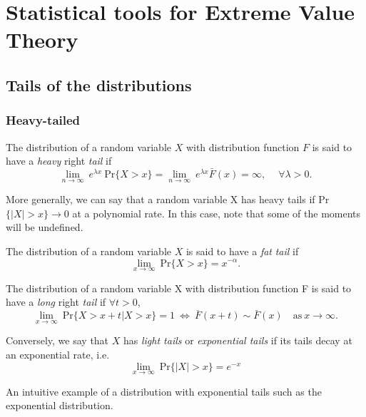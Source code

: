 \thispagestyle{empty}

\chapter{Statistical tools for Extreme Value Theory}\label{appA}

\section{Tails of the distributions}\label{app:tails}


\subsection*{Heavy-tailed} 

\begin{definition}
The distribution of a random variable $X$ with distribution function $F$ is said 
to have a \emph{heavy} right \emph{tail} if 
\begin{equation}
\displaystyle{\lim_{n \to \infty}} \ e^{\lambda x} \ \text{Pr}\{X>x\}=\displaystyle{\lim_{n 
\to \infty}} \ e^{\lambda x} \bar{F}(x)=\infty , \ \quad \forall \lambda>0.
\end{equation}
\end{definition}
More generally, we can say that a random variable X has heavy tails if Pr$\{|X|>x\}\to 0$ at 
a polynomial rate. In this case, note that some of the moments will be undefined.

\begin{definition}
The distribution of a random variable $X$ is said to have a \emph{fat} \emph{tail} if
\begin{equation}
\displaystyle{\lim_{x \to \infty}} \ \text{Pr}\{X>x\}=x^{-\alpha}.
\end{equation}
\end{definition}

\begin{definition}
The distribution of a random variable X with distribution function F is said to have a \emph{long} 
right \emph{tail} if $\forall t > 0$,
\begin{equation}
\displaystyle{\lim_{x \to \infty}} \ \text{Pr}\{X>x+t|X>x\}=1 \ \Leftrightarrow \ 
\bar{F}(x+t)\sim\bar{F}(x) \quad \text{as} \ x\to\infty.
\end{equation}
\end{definition}


\begin{definition}
Conversely, we say that $X$ has \emph{light tails} or \emph{exponential tails} if its tails decay at an exponential rate, i.e. 
\begin{equation}
\displaystyle{\lim_{x \to \infty}} \ \text{Pr}\{|X|>x\}=e^{-x}
\end{equation}
\end{definition}
An intuitive example of a distribution with exponential tails such as the exponential distribution.


